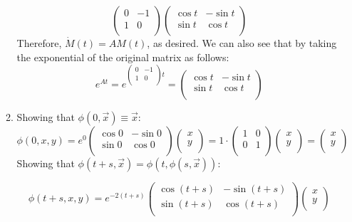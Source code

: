 \documentclass[12pt,letterpaper,reqno]{amsart}
\begin{document}
\begin{enumerate}
\begin{enumerate}
\begin{flushleft}
$$\begin{pmatrix}
  0 & -1 \\
  1 & 0 \\
\end{pmatrix}\begin{pmatrix}
  \cos{t} & -\sin{t} \\
  \sin{t} & \cos{t} \\
\end{pmatrix}$$
Therefore, $\dot{M}(t) = AM(t)$, as desired.\newline
We can also see that by taking the exponential of the original matrix as follows:
$$e^{At} = e^{\begin{pmatrix}
  0 & -1 \\
  1 & 0 \\
\end{pmatrix}t} = \begin{pmatrix}
  \cos{t} & -\sin{t} \\
  \sin{t} & \cos{t} \\
\end{pmatrix}$$
  \end{flushleft}
\newpage
    \item Showing that $\phi(0,\vec{x}) \equiv \vec{x}$:
$$\phi(0,x,y) = e^{0}
\begin{pmatrix}
  \cos{0} & -\sin{0} \\
  \sin{0} & \cos{0} \\
\end{pmatrix}
\begin{pmatrix}
  x \\
  y \\
\end{pmatrix} = 1\cdot
\begin{pmatrix}
  1 & 0 \\
  0 & 1 \\
\end{pmatrix}
\begin{pmatrix}
  x \\
  y \\
\end{pmatrix} =
\begin{pmatrix}
  x \\
  y \\
\end{pmatrix}$$
\newline
Showing that $\phi(t+s,\vec{x}) = \phi(t,\phi(s,\vec{x}))$:

$$\phi(t+s,x,y) = e^{-2(t+s)}
\begin{pmatrix}
  \cos{(t+s)} & -\sin{(t+s)} \\
  \sin{(t+s)} & \cos{(t+s)} \\
\end{pmatrix}
\begin{pmatrix}
  x \\
  y \\
\end{pmatrix}$$


\end{enumerate}
\end{enumerate}
\end{document}
